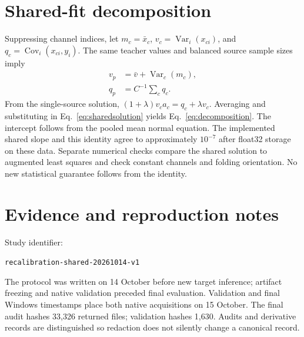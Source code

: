 \documentclass[10pt,twocolumn]{article}
\newcommand{\Var}{\operatorname{Var}}
\newcommand{\Cov}{\operatorname{Cov}}
\begin{document}
\begin{table}[!ht]
\centering\small

\caption{All 70 host final top-1 accuracies (\%), on the same 7,000 images as the native panel. These are quantization-simulation results, not NPU measurements.}
\label{tab:host}
\end{table}

\begin{table}[!ht]
\centering\footnotesize\setlength{\tabcolsep}{3pt}

\caption{Per-target primary contrasts plus Single minus Refit, in pp with conditional 95\% intervals. This displays target variation without treating repeated images as independent calibration replicates. Worst observed values discussed in the text are minima over the relevant rows.}
\label{tab:targets}
\end{table}

\begin{table}[!ht]
\centering\small

\caption{All prespecified secondary equal-target contrasts and pointwise 95\% intervals (pp). These intervals are not multiplicity adjusted. Per-target versions and exact values are in the supplement.}
\label{tab:secondary}
\end{table}

\section{Shared-fit decomposition}\label{app:algebra}
Suppressing channel indices, let $m_c=\bar x_c$, $v_c=\Var_i(x_{ci})$, and $q_c=\Cov_i(x_{ci},y_i)$. The same teacher values and balanced source sample sizes imply
\begin{align}
 v_p&=\bar v+\Var_c(m_c),\\
 q_p&=C^{-1}\sum_c q_c.
\end{align}
From the single-source solution, $(1+\lambda)v_ca_c=q_c+\lambda v_c$. Averaging and substituting in Eq.~\eqref{eq:sharedsolution} yields Eq.~\eqref{eq:decomposition}. The intercept follows from the pooled mean normal equation. The implemented shared slope and this identity agree to approximately $10^{-7}$ after float32 storage on these data. Separate numerical checks compare the shared solution to augmented least squares and check constant channels and folding orientation. No new statistical guarantee follows from the identity.

\section{Evidence and reproduction notes}
Study identifier:
\begin{center}\small\texttt{recalibration-shared-20261014-v1}\end{center}
The protocol was written on 14 October before new target inference; artifact freezing and native validation preceded final evaluation. Validation and final Windows timestamps place both native acquisitions on 15 October. The final audit hashes 33,326 returned files; validation hashes 1,630. Audits and derivative records are distinguished so redaction does not silently change a canonical record.
\end{document}
